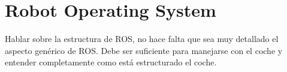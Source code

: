 \chapter{Robot Operating System}
Hablar sobre la estructura de ROS, no hace falta que sea muy detallado el aspecto genérico de ROS. Debe ser suficiente para manejarse con el coche y entender completamente como está estructurado el coche.
\afterpage{\blankpage}
